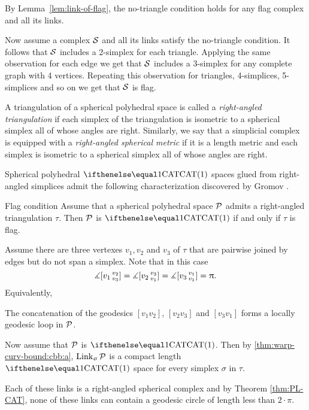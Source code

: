 By Lemma~\ref{lem:link-of-flag}, the no-triangle condition holds 
for any flag complex and all its links.

Now assume a complex $\mathcal{S}$ and all its links satisfy 
the no-triangle condition.
It follows that $\mathcal{S}$ includes a 2-simplex for each triangle.
Applying the same observation for each edge we get that $\mathcal{S}$ 
includes a 3-simplex for any complete graph with 4 vertices.
Repeating this observation 
for triangles, 
4-simplices,
5-simplices
and so on we get that $\mathcal{S}$ is flag.
\qeds


A triangulation of a spherical polyhedral space 
is called a \emph{right-angled triangulation} 
if each simplex of the triangulation is isometric 
to a spherical simplex all of whose angles are right.
Similarly, we say that a simplicial complex 
is equipped with a \emph{right-angled spherical metric}
if it is a length metric and each simplex is isometric 
to a spherical simplex all of whose angles are right.

Spherical polyhedral $\CAT1$ spaces glued from right-angled simplices
admit the following characterization 
discovered by Gromov \cite[p. 122]{gromov:hyp-groups}.

\begin{thm}{Flag condition}\label{thm:flag}
Assume that a spherical polyhedral space $\mathcal{P}$
admits a right-angled triangulation $\tau$.
Then $\mathcal{P}$ is $\CAT1$
if and only if $\tau$ is flag.
\end{thm}

Assume there are three vertexes $v_1,v_2$ and $v_3$ of $\tau$
that are pairwise joined by edges 
but do not span a simplex.
Note that in this case 
$$\measuredangle[v_1\,{}^{v_2}_{v_3}]=\measuredangle[v_2\,{}^{v_3}_{v_1}]=\measuredangle[v_3\,{}^{v_1}_{v_1}]=\uppi.$$
Equivalently,
\begin{clm}{}\label{clm:3pi/2}
The concatenation of the geodesics $[v_1v_2]$, $[v_2v_3]$ and $[v_3v_1]$
forms a locally geodesic loop in $\mathcal{P}$. 
\end{clm}

Now assume that $\mathcal{P}$ is $\CAT1$.
Then by \ref{thm:warp-curv-bound:cbb:a},
$\mathop{\rm Link}\nolimits_\upsigma\mathcal{P}$ is a compact length $\CAT1$ space for every simplex $\sigma$ 
in $\tau$. 

Each of these links is a right-angled spherical complex
and
by Theorem \ref{thm:PL-CAT}, 
none
of these links can contain a geodesic circle of length less than $2\cdot\pi$. 

